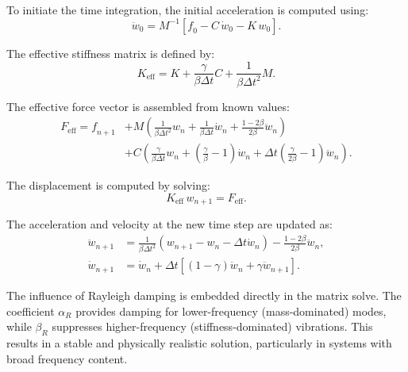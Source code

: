 \documentclass{article}
\begin{document}
	To initiate the time integration, the initial acceleration is computed using:
	\begin{equation}
		\ddot{\mathit{{w}}}_0 = \mathit{{M}}^{-1} \left[ \mathit{{f}}_0 - \mathit{{C}}\, \dot{\mathit{{w}}}_0 - \mathit{{K}}\, \mathit{{w}}_0 \right].
	\end{equation}
	
	The effective stiffness matrix is defined by:
	\begin{equation}
		\mathit{{K}}_{\text{eff}} = \mathit{{K}} + \frac{\gamma}{\beta \Delta t} \mathit{{C}} + \frac{1}{\beta \Delta t^2} \mathit{{M}}.
	\end{equation}
	
	The effective force vector is assembled from known values:
	\begin{align}
		\mathit{{F}}_{\text{eff}} = \mathit{{f}}_{n+1}
		&+ \mathit{{M}} \left( \frac{1}{\beta \Delta t^2} \mathit{{w}}_n + \frac{1}{\beta \Delta t} \dot{\mathit{{w}}}_n + \frac{1 - 2\beta}{2\beta} \ddot{\mathit{{w}}}_n \right) \\
		&+ \mathit{{C}} \left( \frac{\gamma}{\beta \Delta t} \mathit{{w}}_n + \left( \frac{\gamma}{\beta} - 1 \right) \dot{\mathit{{w}}}_n + \Delta t \left( \frac{\gamma}{2\beta} - 1 \right) \ddot{\mathit{{w}}}_n \right).
	\end{align}
	
	The displacement is computed by solving:
	\begin{equation}
		\mathit{{K}}_{\text{eff}}\, \mathit{{w}}_{n+1} = \mathit{{F}}_{\text{eff}}.
	\end{equation}
	
	The acceleration and velocity at the new time step are updated as:
	\begin{align}
		\ddot{\mathit{{w}}}_{n+1} &= \frac{1}{\beta \Delta t^2} \left( \mathit{{w}}_{n+1} - \mathit{{w}}_n - \Delta t \dot{\mathit{{w}}}_n \right) - \frac{1 - 2\beta}{2\beta} \ddot{\mathit{{w}}}_n, \\
		\dot{\mathit{{w}}}_{n+1} &= \dot{\mathit{{w}}}_n + \Delta t \left[ (1 - \gamma) \ddot{\mathit{{w}}}_n + \gamma \ddot{\mathit{{w}}}_{n+1} \right].
	\end{align}
	
	The influence of Rayleigh damping is embedded directly in the matrix solve. The coefficient \( \alpha_R \) provides damping for lower-frequency (mass-dominated) modes, while \( \beta_R \) suppresses higher-frequency (stiffness-dominated) vibrations. This results in a stable and physically realistic solution, particularly in systems with broad frequency content.
	
\end{document}

